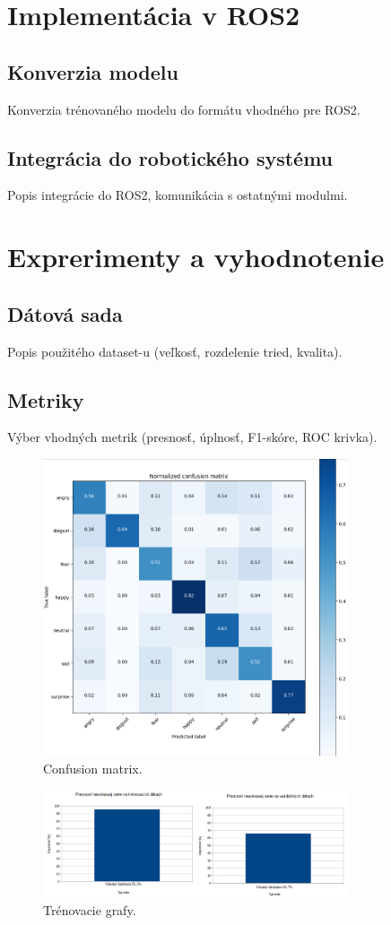 \section{Implementácia v ROS2}
\subsection{Konverzia modelu}Konverzia trénovaného modelu do formátu vhodného pre ROS2.
\subsection{Integrácia do robotického systému}Popis integrácie do ROS2, komunikácia s ostatnými modulmi.

\section{Exprerimenty a vyhodnotenie}
\subsection{Dátová sada} Popis použitého dataset-u (veľkosť, rozdelenie tried, kvalita).
\subsection{Metriky} Výber vhodných metrik (presnosť, úplnosť, F1-skóre, ROC krivka).
\begin{figure}[!htpb]
    \centering
    \includegraphics[width=0.8\textwidth]{img/confusion.png}
    \caption{Confusion matrix.}
    \label{fig:confusion}
\end{figure}
\begin{figure}[!htpb]
    \centering
    \includegraphics[width=0.8\textwidth]{img/train_graphs.png}
    \caption{Trénovacie grafy.}
    \label{fig:roc}
\end{figure}
\newpage

